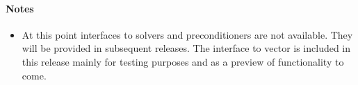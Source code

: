 \paragraph{\bf Notes} 
           
\begin{itemize}
                                        
\item
  {\warn}At this point interfaces to {\hypre} solvers and preconditioners are 
  not available. They will be provided in subsequent {\sundials} releases. 
  The interface to {\hypre} vector is included in this release mainly for 
  testing purposes and as a preview of functionality to come.

\end{itemize}




